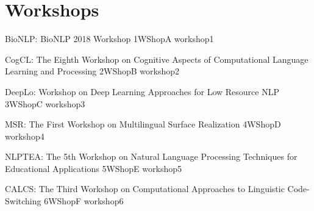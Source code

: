 \cleardoublepage
\chapter[Workshops: \daydate]{Workshops}
\thispagestyle{emptyheader}
\vfill


\afterpage{\null\newpage}
\newpage
\clearpage




\begin{wsschedule}
  {BioNLP: BioNLP 2018 Workshop}
  {1}{WShopA}
  {workshop1}
  {\WShopLocA}
  
\end{wsschedule}

\begin{wsschedule}
  {CogCL: The Eighth Workshop on Cognitive Aspects of Computational Language Learning and Processing}
  {2}{WShopB}
  {workshop2}
  {\WShopLocB}
  
\end{wsschedule}

\begin{wsschedule}
  {DeepLo: Workshop on Deep Learning Approaches for Low Resource NLP}
  {3}{WShopC}
  {workshop3}
  {\WShopLocC}
  \clearpage
\end{wsschedule}

\begin{wsschedule}
  {MSR: The First Workshop on Multilingual Surface Realization}
  {4}{WShopD}
  {workshop4}
  {\WShopLocD}
  
\end{wsschedule}

\begin{wsschedule}
  {NLPTEA: The 5th Workshop on Natural Language Processing Techniques 
  for Educational Applications}
  {5}{WShopE}
  {workshop5}
  {\WShopLocE}
  
\end{wsschedule}

\begin{wsschedule}
  {CALCS: The Third Workshop on Computational Approaches to Linguistic 
  Code-Switching}
  {6}{WShopF}
  {workshop6}
  {\WShopLocF}
  
\end{wsschedule}


